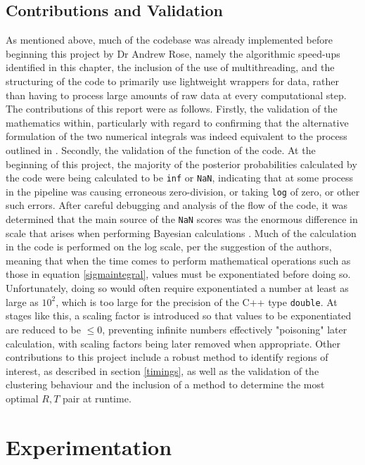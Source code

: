 \documentclass[11pt]{article}
\begin{document}
\subsection{Contributions and Validation}

As mentioned above, much of the codebase was already implemented before beginning this project by Dr Andrew Rose, namely the algorithmic speed-ups identified in this chapter, the inclusion of the use of multithreading, and the structuring of the code to primarily use lightweight wrappers for data, rather than having to process large amounts of raw data at every computational step. The contributions of this report were as follows.
Firstly, the validation of the mathematics within, particularly with regard to confirming that the alternative formulation of the two numerical integrals was indeed equivalent to the process outlined in \cite{Rubin-Delanchy2015}.
Secondly, the validation of the function of the code. At the beginning of this project, the majority of the posterior probabilities calculated by the code were being calculated to be \texttt{inf} or \texttt{NaN}, indicating that at some process in the pipeline was causing erroneous zero-division, or taking \texttt{log} of zero, or other such errors. After careful debugging and analysis of the flow of the code, it was determined that the main source of the \texttt{NaN} scores was the enormous difference in scale that arises when performing Bayesian calculations \cite{Rubin-Delanchy2015}. Much of the calculation in the code is performed on the log scale, per the suggestion of the authors, meaning that when the time comes to perform mathematical operations such as those in equation \ref{sigmaintegral}, values must be exponentiated before doing so. Unfortunately, doing so would often require exponentiated a number at least as large as $10^2$, which is too large for the precision of the C++ type \texttt{double}. At stages like this, a scaling factor is introduced so that values to be exponentiated are reduced to be $\leq 0 $, preventing infinite numbers effectively "poisoning" later calculation, with scaling factors being later removed when appropriate.
Other contributions to this project include a robust method to identify regions of interest, as described in section \ref{timings}, as well as the validation of the clustering behaviour and the inclusion of a method to determine the most optimal $R,T$ pair at runtime.





\section{Experimentation}
\end{document}
